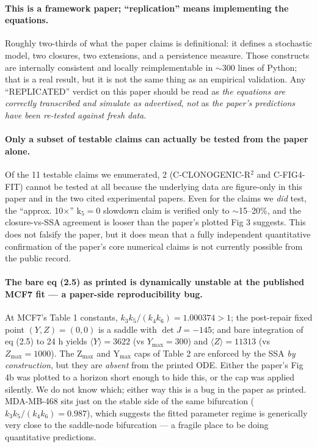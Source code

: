 \documentclass[11pt]{article}
\begin{document}
\paragraph{This is a framework paper; ``replication'' means implementing the equations.}
Roughly two-thirds of what the paper claims is definitional: it defines a stochastic model, two
closures, two extensions, and a persistence measure. Those constructs are internally consistent
and locally reimplementable in $\sim$300 lines of Python; that is a real result, but it is not the
same thing as an empirical validation. Any ``REPLICATED'' verdict on this paper should be read as
\emph{the equations are correctly transcribed and simulate as advertised}, \emph{not} as \emph{the
paper's predictions have been re-tested against fresh data}.

\paragraph{Only a subset of testable claims can actually be tested from the paper alone.}
Of the 11 testable claims we enumerated, 2 (C-CLONOGENIC-R$^2$ and C-FIG4-FIT) cannot be tested at
all because the underlying data are figure-only in this paper and in the two cited experimental
papers. Even for the claims we \emph{did} test, the ``approx. 10$\times$'' k$_5{=}0$ slowdown claim
is verified only to $\sim$15--20\%, and the closure-vs-SSA agreement is looser than the paper's
plotted Fig 3 suggests. This does not falsify the paper, but it does mean that a fully independent
quantitative confirmation of the paper's core numerical claims is not currently possible from the
public record.

\paragraph{The bare eq (2.5) as printed is dynamically unstable at the published MCF7 fit --- a
paper-side reproducibility bug.} At MCF7's Table 1 constants, $k_3 k_5/(k_4 k_6) = 1.000374 > 1$;
the post-repair fixed point $(Y,Z) = (0,0)$ is a saddle with $\det J = -145$; and bare integration
of eq (2.5) to 24 h yields $\langle Y\rangle = 3622$ (vs $Y_{\max}=300$) and
$\langle Z\rangle = 11313$ (vs $Z_{\max}=1000$). The Z$_{\max}$ and Y$_{\max}$ caps of Table 2 are
enforced by the SSA \emph{by construction}, but they are \emph{absent} from the printed ODE. Either
the paper's Fig 4b was plotted to a horizon short enough to hide this, or the cap was applied
silently. We do not know which; either way this is a bug in the paper as printed. MDA-MB-468 sits
just on the stable side of the same bifurcation ($k_3 k_5/(k_4 k_6) = 0.987$), which suggests the
fitted parameter regime is generically very close to the saddle-node bifurcation --- a fragile
place to be doing quantitative predictions.
\end{document}
